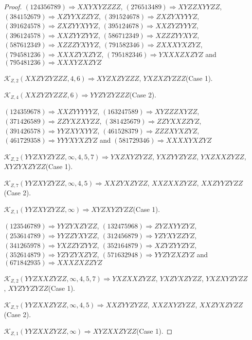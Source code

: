 \documentclass[12pt]{article}
\theoremstyle{plain}
\theoremstyle{definition}
\theoremstyle{remark}
\newcommand{\fancy}[1]{\mathcal{#1}}
\def\K{\fancy{K}}
\begin{document}
\begin{proof}
	
	
	$(1 2 4 3 5 6 7 8 9)\Rightarrow XXYXYZZZZ$, $(2 7 6 5 1 3 4 8 9)\Rightarrow XYZZXYYZZ$, $(3 8 4 1 5 2 6 7 9)\Rightarrow XZYYXZZYZ$, $(3 9 1 5 2 4 6 7 8)\Rightarrow ZXZYXYYYZ$, $(3 9 1 6 2 4 5 7 8)\Rightarrow ZXZYYXYYZ$, $(3 9 5 1 2 4 6 7 8)\Rightarrow XXZYZYYYZ$, $(3 9 6 1 2 4 5 7 8)\Rightarrow XXZYYZYYZ$, $(5 8 6 7 1 2 3 4 9)\Rightarrow XZZZYYXYZ$, $(5 8 7 6 1 2 3 4 9)\Rightarrow XZZZYXYYZ$, $(7 9 1 5 8 2 3 4 6)\Rightarrow ZXXXYXZYZ$, $(7 9 4 5 8 1 2 3 6)\Rightarrow XXXZYXZYZ$, $(7 9 5 1 8 2 3 4 6)\Rightarrow YXXXZXZYZ$ and $(7 9 5 4 8 1 2 3 6)\Rightarrow XXXYZXZYZ$
	
	
	$\K_{Z,2}(XXZYZYZZZ,4, 6)\Rightarrow $$XYZXZYZZZ$, $YXZXZYZZZ$(Case 1).
	
	$\K_{Z,4}(XXZYZYZZZ,6)\Rightarrow $$YYZYZYZZZ$(Case 2).
	
	
	
	$(1 2 4 3 5 9 6 7 8)\Rightarrow XXZYYYYYZ$, $(1 6 3 2 4 7 5 8 9)\Rightarrow XYZZZXYZZ$, $(3 7 1 4 2 6 5 8 9)\Rightarrow ZZYXZXYZZ$, $(3 8 1 4 2 5 6 7 9)\Rightarrow ZZYXXZZYZ$, $(3 9 1 4 2 6 5 7 8)\Rightarrow YYZXYXYYZ$, $(4 6 1 5 2 8 3 7 9)\Rightarrow ZZZXYXZYZ$, $(4 6 1 7 2 9 3 5 8)\Rightarrow YYYXYXZYZ$ and $(5 8 1 7 2 9 3 4 6)\Rightarrow XXXXYXZYZ$
	
	
	$\K_{Z,2}(YYZXYZYZZ,\infty,4, 5, 7)\Rightarrow $$YXZXYZYZZ$, $YXZYYZYZZ$, $YXZXXZYZZ$, $XYZYXZYZZ$(Case 1).
	
	$\K_{Z,7}(YYZXYZYZZ,\infty,4, 5)\Rightarrow $$XXZYXZYZZ$, $XXZXXZYZZ$, $XXZYYZYZZ$(Case 2).
	
	$\K_{Z,1}(YYZXYZYZZ,\infty)\Rightarrow $$XYZXYZYZZ$(Case 1).
	
	
	
	$(1 2 3 5 4 6 7 8 9)\Rightarrow YYZYXZYZZ$, $(1 3 2 4 7 5 9 6 8)\Rightarrow ZYZXYYZYZ$, $(2 5 3 6 1 4 7 8 9)\Rightarrow YYZZYXYZZ$, $(3 1 2 4 5 6 8 7 9)\Rightarrow YZYXYZZYZ$, $(3 4 1 2 6 5 9 7 8)\Rightarrow YXZZYZYYZ$, $(3 5 2 1 6 4 8 7 9)\Rightarrow XZYZYYZYZ$, $(3 5 2 6 1 4 8 7 9)\Rightarrow YZYZYXZYZ$, $(5 7 1 6 3 2 9 4 8)\Rightarrow YYZYZXZYZ$ and $(6 7 1 8 4 2 9 3 5)\Rightarrow XXXZXZZYZ$
	
	
	$\K_{Z,2}(YYZXXZYZZ,\infty,4, 5, 7)\Rightarrow $$YXZXXZYZZ$, $YXZYXZYZZ$, $YXZXYZYZZ$, $XYZYYZYZZ$(Case 1).
	
	$\K_{Z,7}(YYZXXZYZZ,\infty,4, 5)\Rightarrow $$XXZYYZYZZ$, $XXZXYZYZZ$, $XXZYXZYZZ$(Case 2).
	
	$\K_{Z,1}(YYZXXZYZZ,\infty)\Rightarrow $$XYZXXZYZZ$(Case 1).
	
	
	

\end{proof}
\end{document}
